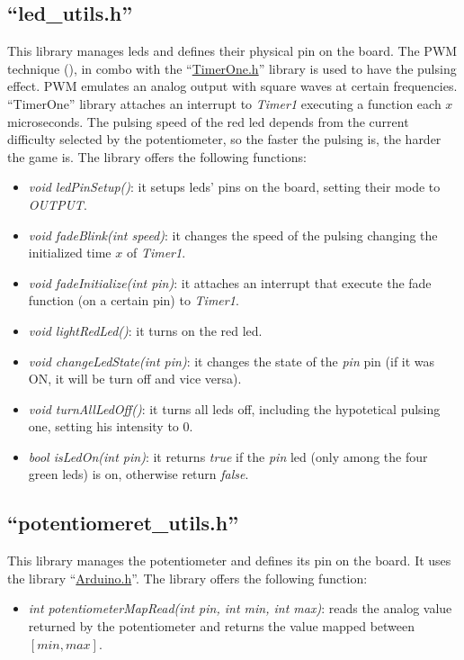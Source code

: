 \documentclass[a4paper,12pt]{report}
\begin{document}
    \subsection{``led\_utils.h''}

    This library manages leds and defines their physical pin on the board. The PWM technique (), in combo with the ``\href{https://github.com/PaulStoffregen/TimerOne}{TimerOne.h}'' library is used to have the pulsing effect. PWM emulates an analog output with square waves at certain frequencies. ``TimerOne'' library attaches an interrupt to \textit{Timer1} executing a function each $x$ microseconds. The pulsing speed of the red led depends from the current difficulty selected by the potentiometer, so the faster the pulsing is, the harder the game is.
    \newline
    \newline
    The library offers the following functions:
    \begin{itemize}
        \item \textit{void ledPinSetup()}: it setups leds' pins on the board, setting their mode to \textit{OUTPUT}. 
        \item \textit{void fadeBlink(int speed)}: it changes the speed of the pulsing changing the initialized time $x$ of \textit{Timer1}. 
        \item \textit{void fadeInitialize(int pin)}: it attaches an interrupt that execute the fade function (on a certain pin) to \textit{Timer1}. 
        \item \textit{void lightRedLed()}: it turns on the red led. 
        \item \textit{void changeLedState(int pin)}: it changes the state of the \textit{pin} pin (if it was ON, it will be turn off and vice versa). 
        \item \textit{void turnAllLedOff()}: it turns all leds off, including the hypotetical pulsing one, setting his intensity to 0. 
        \item \textit{bool isLedOn(int pin)}: it returns \textit{true} if the \textit{pin} led (only among the four green leds) is on, otherwise return \textit{false}.
    \end{itemize}
    
    \subsection{``potentiomeret\_utils.h''}

    This library manages the potentiometer and defines its pin on the board. It uses the library ``\href{https://github.com/arduino/ArduinoCore-avr/blob/master/cores/arduino/Arduino.h}{Arduino.h}''. 
    \newline
    \newline
    The library offers the following function:
    \begin{itemize}
        \item \textit{int potentiometerMapRead(int pin, int min, int max)}: reads the analog value returned by the potentiometer and returns the value mapped between $[min, max]$.
    \end{itemize}
    
\end{document}

